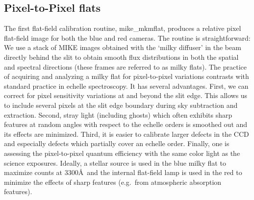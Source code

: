 \documentclass[12pt,preprint]{aastex}
\begin{document}
\subsection{Pixel-to-Pixel flats}
\label{sec:mflat}

The first flat-field calibration routine, mike\_mkmflat,
produces a relative pixel flat-field image for both the blue 
and red cameras.  The routine is straightforward: We use a stack of
MIKE images obtained with the `milky diffuser' in the beam directly behind
the slit to obtain smooth flux distributions in both the spatial and 
spectral directions (these frames are referred to as milky flats).
The practice of acquiring and analyzing a milky flat for pixel-to-pixel
variations contrasts with standard practice in echelle spectroscopy.
It has several advantages.  First, we can correct for pixel sensitivity
variations at and beyond the slit edge.  This allows us to include
several pixels at the slit edge boundary during sky subtraction
and extraction.  Second, stray light (including ghosts) which often exhibits
sharp features at random angles with respect to the echelle orders
is smoothed out and its effects are minimized.  
Third, it is easier to calibrate larger defects in the CCD and
especially defects which partially cover an echelle order.
Finally, one is assessing the pixel-to-pixel quantum efficiency with
the same color light as the science exposures.
Ideally, a stellar source is used in the blue milky flat to maximize
counts at 3300\AA\
and the internal flat-field lamp is used in the red  
to minimize the effects of sharp features (e.g.\ from atmospheric absorption
features).
\end{document}
